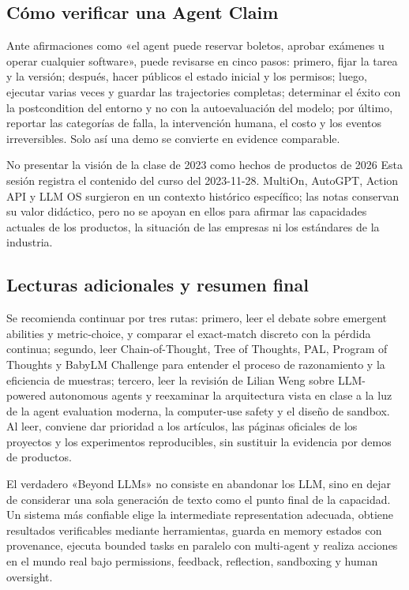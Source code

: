 \documentclass[a4paper]{article}
\begin{document}
\subsection{Cómo verificar una Agent Claim}

Ante afirmaciones como «el agent puede reservar boletos, aprobar exámenes u operar cualquier software», puede revisarse en cinco pasos: primero, fijar la tarea y la versión; después, hacer públicos el estado inicial y los permisos; luego, ejecutar varias veces y guardar las trajectories completas; determinar el éxito con la postcondition del entorno y no con la autoevaluación del modelo; por último, reportar las categorías de falla, la intervención humana, el costo y los eventos irreversibles. Solo así una demo se convierte en evidence comparable.

\begin{warningbox}{No presentar la visión de la clase de 2023 como hechos de productos de 2026}
Esta sesión registra el contenido del curso del 2023-11-28. MultiOn, AutoGPT, Action API y LLM OS surgieron en un contexto histórico específico; las notas conservan su valor didáctico, pero no se apoyan en ellos para afirmar las capacidades actuales de los productos, la situación de las empresas ni los estándares de la industria.
\end{warningbox}

\subsection{Lecturas adicionales y resumen final}

\enlargethispage{5\baselineskip}

Se recomienda continuar por tres rutas: primero, leer el debate sobre emergent abilities y metric-choice, y comparar el exact-match discreto con la pérdida continua; segundo, leer Chain-of-Thought, Tree of Thoughts, PAL, Program of Thoughts y BabyLM Challenge para entender el proceso de razonamiento y la eficiencia de muestras; tercero, leer la revisión de Lilian Weng sobre LLM-powered autonomous agents y reexaminar la arquitectura vista en clase a la luz de la agent evaluation moderna, la computer-use safety y el diseño de sandbox. Al leer, conviene dar prioridad a los artículos, las páginas oficiales de los proyectos y los experimentos reproducibles, sin sustituir la evidencia por demos de productos.

El verdadero «Beyond LLMs» no consiste en abandonar los LLM, sino en dejar de considerar una sola generación de texto como el punto final de la capacidad. Un sistema más confiable elige la intermediate representation adecuada, obtiene resultados verificables mediante herramientas, guarda en memory estados con provenance, ejecuta bounded tasks en paralelo con multi-agent y realiza acciones en el mundo real bajo permissions, feedback, reflection, sandboxing y human oversight.
\end{document}
